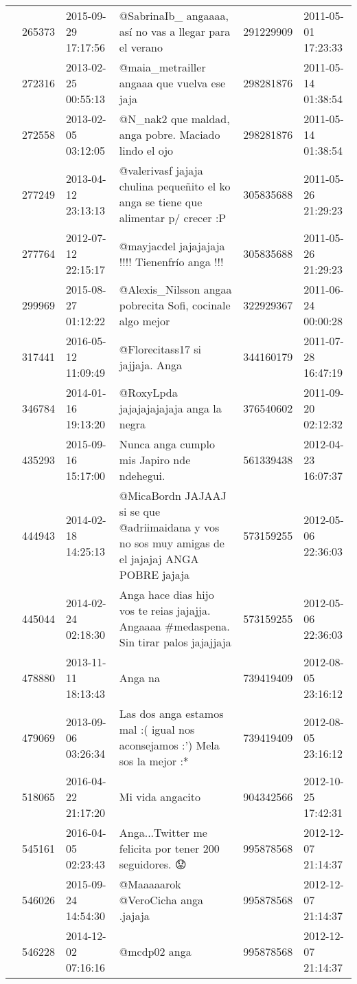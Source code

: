 \begin{tabular}{llllrl}
 & 265373& 2015-09-29 17:17:56 &@SabrinaIb\_ angaaaa, así no vas a llegar para el verano & 291229909 & 2011-05-01 17:23:33 \\
 & 272316& 2013-02-25 00:55:13 &@maia\_metrailler angaaa que vuelva ese jaja & 298281876 & 2011-05-14 01:38:54 \\
 & 272558& 2013-02-05 03:12:05 & @N\_nak2 que maldad, anga pobre. Maciado lindo el ojo & 298281876 & 2011-05-14 01:38:54 \\
 & 277249& 2013-04-12 23:13:13 &@valerivasf jajaja chulina pequeñito el ko anga se tiene que alimentar p/ crecer :P & 305835688 & 2011-05-26 21:29:23 \\
 & 277764& 2012-07-12 22:15:17 & @mayjacdel jajajajaja !!!! Tienenfrío anga !!! & 305835688 & 2011-05-26 21:29:23 \\
 & 299969& 2015-08-27 01:12:22 &@Alexis\_Nilsson angaa pobrecita Sofi, cocinale algo mejor & 322929367 & 2011-06-24 00:00:28 \\
 & 317441& 2016-05-12 11:09:49 &@Florecitass17 si jajjaja. Anga & 344160179 & 2011-07-28 16:47:19 \\
 & 346784& 2014-01-16 19:13:20 & @RoxyLpda jajajajajajaja anga la negra & 376540602 & 2011-09-20 02:12:32 \\
 & 435293& 2015-09-16 15:17:00 & Nunca anga cumplo mis Japiro nde ndehegui. & 561339438 & 2012-04-23 16:07:37 \\
 & 444943& 2014-02-18 14:25:13 &@MicaBordn JAJAAJ si se que @adriimaidana y vos no sos muy amigas de el jajajaj ANGA POBRE jajaja & 573159255 & 2012-05-06 22:36:03 \\
 & 445044& 2014-02-24 02:18:30 &Anga hace dias hijo vos te reias jajajja. Angaaaa \#medaspena. Sin tirar palos jajajjaja & 573159255 & 2012-05-06 22:36:03 \\
 & 478880& 2013-11-11 18:13:43 &Anga na & 739419409 & 2012-08-05 23:16:12 \\
 & 479069& 2013-09-06 03:26:34 & Las dos anga estamos mal :( igual nos aconsejamos :') Mela sos la mejor :* & 739419409 & 2012-08-05 23:16:12 \\
 & 518065& 2016-04-22 21:17:20 & Mi vida angacito & 904342566 & 2012-10-25 17:42:31 \\
 & 545161& 2016-04-05 02:23:43 & Anga...Twitter me felicita por tener 200 seguidores. 😟 & 995878568 & 2012-12-07 21:14:37 \\
 & 546026& 2015-09-24 14:54:30 & @Maaaaarok @VeroCicha anga .jajaja & 995878568 & 2012-12-07 21:14:37 \\
 & 546228& 2014-12-02 07:16:16 & @mcdp02 anga & 995878568 & 2012-12-07 21:14:37 \\

\end{tabular}
